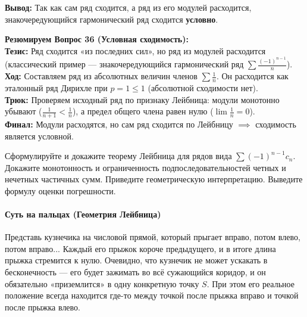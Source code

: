 \textbf{Вывод:} Так как сам ряд сходится, а ряд из его модулей расходится, знакочередующийся гармонический ряд сходится \textbf{условно}.
\begin{tcolorbox}[colback=gray!5, colframe=black, boxrule=0.5pt, arc=0pt]
\textbf{Резюмируем Вопрос 36 (Условная сходимость):} \\
\textbf{Тезис:} Ряд сходится «из последних сил», но ряд из модулей расходится (классический пример — знакочередующийся гармонический ряд $\sum \frac{(-1)^{n-1}}{n}$). \\
\textbf{Ход:} Составляем ряд из абсолютных величин членов $\sum \frac{1}{n}$. Он расходится как эталонный ряд Дирихле при $p = 1 \le 1$ (абсолютной сходимости нет). \\
\textbf{Трюк:} Проверяем исходный ряд по признаку Лейбница: модули монотонно убывают ($\frac{1}{n+1} < \frac{1}{n}$), а предел общего члена равен нулю ($\lim \frac{1}{n} = 0$). \\
\textbf{Финал:} Модули расходятся, но сам ряд сходится по Лейбницу $\implies$ сходимость является условной.
\end{tcolorbox}




{Сформулируйте и докажите теорему Лейбница для рядов вида $\sum(-1)^{n-1}c_{n}$. Докажите монотонность и ограниченность подпоследовательностей четных и нечетных частичных сумм. Приведите геометрическую интерпретацию. Выведите формулу оценки погрешности.}

\paragraph{Суть на пальцах (Геометрия Лейбница)}
Представь кузнечика на числовой прямой, который прыгает вправо, потом влево, потом вправо... Каждый его прыжок короче предыдущего, и в итоге длина прыжка стремится к нулю. Очевидно, что кузнечик не может ускакать в бесконечность — его будет зажимать во всё сужающийся коридор, и он обязательно «приземлится» в одну конкретную точку $S$. При этом его реальное положение всегда находится где-то между точкой после прыжка вправо и точкой после прыжка влево.

